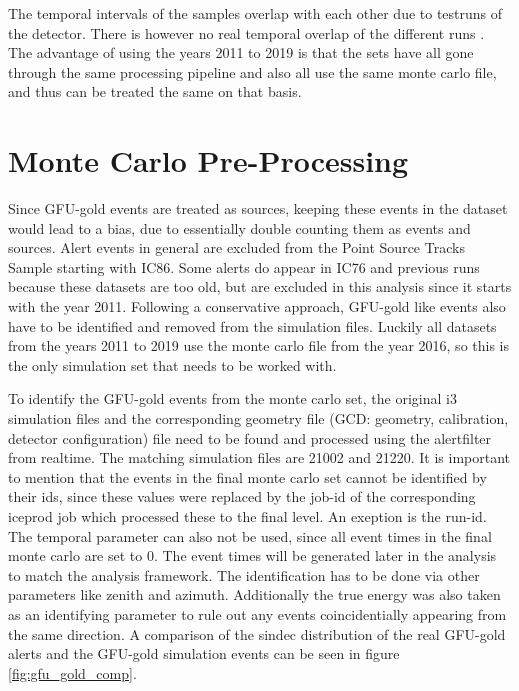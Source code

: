 The temporal intervals of the samples overlap with each other due to testruns of the detector.
There is however no real temporal overlap of the different runs \cite{private_com}.
The advantage of using the years 2011 to 2019 is that the sets have all gone through the same processing pipeline and also all use the same monte carlo file, and thus can be treated the same on that basis.

\section{Monte Carlo Pre-Processing}

Since GFU-gold events are treated as sources, keeping these events in the dataset would lead to a bias, due to essentially double counting them as events and sources.
Alert events in general are excluded from the Point Source Tracks Sample starting with IC86.
Some alerts do appear in IC76 and previous runs because these datasets are too old, but are excluded in this analysis since it starts with the year 2011.
Following a conservative approach, GFU-gold like events also have to be identified and removed from the simulation files.
Luckily all datasets from the years 2011 to 2019 use the monte carlo file from the year 2016, so this is the only simulation set that needs to be worked with.

To identify the GFU-gold events from the monte carlo set, the original i3 simulation files and the corresponding geometry file (GCD: geometry, calibration, detector configuration) file need to be found and processed using the alertfilter from realtime.
The matching simulation files are 21002 and 21220.
It is important to mention that the events in the final monte carlo set cannot be identified by their ids, since these values were replaced by the job-id of the corresponding iceprod job which processed these to the final level. An exeption is the run-id.
The temporal parameter can also not be used, since all event times in the final monte carlo are set to \num{0}.
The event times will be generated later in the analysis to match the analysis framework.
The identification has to be done via other parameters like zenith and azimuth.
Additionally the true energy was also taken as an identifying parameter to rule out any events coincidentially appearing from the same direction.
A comparison of the sindec distribution of the real GFU-gold alerts and the GFU-gold simulation events can be seen in figure \ref{fig:gfu_gold_comp}.

